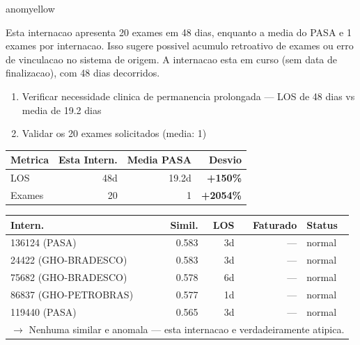 \documentclass[a4paper,10pt]{article}
\begin{document}
\begin{anomalycard}[Internacao 182309 | PASA | MODERADO (z=2.03)]{anomyellow}
\vspace{2pt}\begin{tcolorbox}[colback=severityred!20,colframe=anomyellow,title={\textbf{Interpretacao de Negocio}},fonttitle=\bfseries\small,left=4pt,right=4pt,top=3pt,bottom=3pt]
{\small Esta internacao apresenta 20 exames em 48 dias, enquanto a media do PASA e 1 exames por internacao. Isso sugere possivel acumulo retroativo de exames ou erro de vinculacao no sistema de origem. A internacao esta em curso (sem data de finalizacao), com 48 dias decorridos.}
\end{tcolorbox}
\begin{tcolorbox}[colback=severityyellow!30,colframe=anomorange,title={\textbf{Recomendacoes Especificas}},fonttitle=\bfseries\small,left=4pt,right=4pt,top=3pt,bottom=3pt]
\begin{enumerate}[nosep,leftmargin=16pt]
\item {\small Verificar necessidade clinica de permanencia prolongada --- LOS de 48 dias vs media de 19.2 dias}
\item {\small Validar os 20 exames solicitados (media: 1)}
\end{enumerate}
\end{tcolorbox}
\begin{center}\begin{tabular}{l r r r}\toprule\textbf{Metrica} & \textbf{Esta Intern.} & \textbf{Media PASA} & \textbf{Desvio} \\\midrule
LOS & 48d & 19.2d & \textcolor{anomred}{\textbf{+150\%}} \\
Exames & 20 & 1 & \textcolor{anomred}{\textbf{+2054\%}} \\
\bottomrule\end{tabular}\end{center}

\begin{tabular}{l r r r l}\toprule\textbf{Intern.} & \textbf{Simil.} & \textbf{LOS} & \textbf{Faturado} & \textbf{Status} \\\midrule
136124 (PASA) & 0.583 & 3d & --- & \textcolor{jcubeblue}{normal} \\
24422 (GHO-BRADESCO) & 0.583 & 3d & --- & \textcolor{jcubeblue}{normal} \\
75682 (GHO-BRADESCO) & 0.578 & 6d & --- & \textcolor{jcubeblue}{normal} \\
86837 (GHO-PETROBRAS) & 0.577 & 1d & --- & \textcolor{jcubeblue}{normal} \\
119440 (PASA) & 0.565 & 3d & --- & \textcolor{jcubeblue}{normal} \\
\multicolumn{5}{l}{\textcolor{jcubeblue}{\small $\rightarrow$ Nenhuma similar e anomala --- esta internacao e verdadeiramente atipica.}} \\
\bottomrule\end{tabular}


\end{anomalycard}
\end{document}
